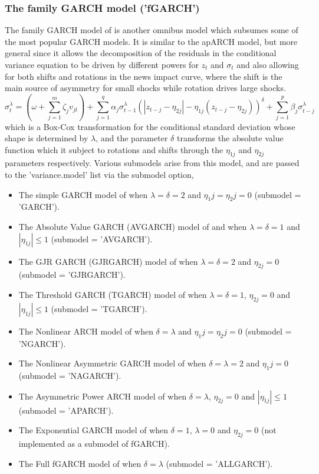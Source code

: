 \subsubsection{The family GARCH model ('fGARCH')}\label{section:fgarch}
The family GARCH model of \citet{Hentschel1} is another omnibus model which
subsumes some of the most popular GARCH models. It is similar to the apARCH
model, but more general since it allows the decomposition of the residuals in
the conditional variance equation to be driven by different powers for $z_t$
and $\sigma_t$ and also allowing for both shifts and rotations in the news
impact curve, where the shift is the main source of asymmetry for small shocks
while rotation drives large shocks.
\begin{equation}\label{eq:fgarch}
\sigma _t^\lambda  = \left( {\omega  + \sum\limits_{j = 1}^m {{\zeta _j}{v_{jt}}} } \right) + \sum\limits_{j = 1}^q {{\alpha _j}\sigma _{t - 1}^\lambda {{\left( {\left| {{z_{t - j}} - {\eta _{2j}}} \right| - {\eta _{1j}}\left( {{z_{t - j}} - {\eta _{2j}}} \right)} \right)}^\delta } + } \sum\limits_{j = 1}^p {{\beta _j}\sigma _{t - j}^\lambda }
\end{equation}
which is a Box-Cox transformation for the conditional standard deviation whose
shape is determined by $\lambda$, and the parameter $\delta$ transforms the
absolute value function which it subject to rotations and shifts through the
$\eta_{1j}$ and $\eta_{2j}$ parameters respectively. Various submodels arise
from this model, and are passed to the \verb@ugarchspec@ 'variance.model' list
via the submodel option,
\begin{itemize}
\item The simple GARCH model of \citet{Bollerslev1} when $\lambda=\delta=2$ and $\eta_1j=\eta_2j=0$ (submodel = 'GARCH').
\item The Absolute Value GARCH (AVGARCH) model of \citet{Taylor} and \citet{Schwert} when $\lambda=\delta=1$ and $|{{\eta _{1j}}}| \leq 1$ (submodel = 'AVGARCH').
\item The GJR GARCH (GJRGARCH) model of \citet{Glosten1} when $\lambda=\delta=2$ and $\eta_{2j}=0$ (submodel = 'GJRGARCH').
\item The Threshold GARCH (TGARCH) model of \citet{Zakoian} when $\lambda=\delta=1$, $\eta_{2j}=0$ and $|{{\eta _{1j}}}| \leq 1$ (submodel = 'TGARCH').
\item The Nonlinear ARCH model of \citet{Higgins} when $\delta=\lambda$ and  $\eta_1j=\eta_2j=0$ (submodel = 'NGARCH').
\item The Nonlinear Asymmetric GARCH model of \citet{EngleNg} when $\delta=\lambda=2$ and $\eta_1j=0$ (submodel = 'NAGARCH').
\item The Asymmetric Power ARCH model of \citet{Ding1} when $\delta=\lambda$, $\eta_{2j}=0$ and $|{{\eta _{1j}}}| \leq 1$ (submodel = 'APARCH').
\item The Exponential GARCH model of \citet{Nelson} when $\delta=1$, $\lambda=0$ and $\eta_{2j}=0$ (not implemented as a submodel of fGARCH).
\item The Full fGARCH model of \citet{Hentschel1} when $\delta=\lambda$ (submodel = 'ALLGARCH').
\end{itemize}
